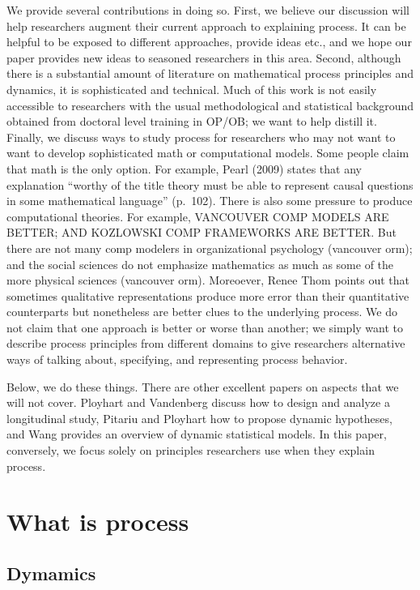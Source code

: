 \documentclass[english,,man]{apa6}
\theoremstyle{definition}
\theoremstyle{definition}
\theoremstyle{definition}
\theoremstyle{remark}
\begin{document}
We provide several contributions in doing so. First, we believe our
discussion will help researchers augment their current approach to
explaining process. It can be helpful to be exposed to different
approaches, provide ideas etc., and we hope our paper provides new ideas
to seasoned researchers in this area. Second, although there is a
substantial amount of literature on mathematical process principles and
dynamics, it is sophisticated and technical. Much of this work is not
easily accessible to researchers with the usual methodological and
statistical background obtained from doctoral level training in OP/OB;
we want to help distill it. Finally, we discuss ways to study process
for researchers who may not want to want to develop sophisticated math
or computational models. Some people claim that math is the only option.
For example, Pearl (2009) states that any explanation \enquote{worthy of
the title theory must be able to represent causal questions in some
mathematical language} (p.~102). There is also some pressure to produce
computational theories. For example, VANCOUVER COMP MODELS ARE BETTER;
AND KOZLOWSKI COMP FRAMEWORKS ARE BETTER. But there are not many comp
modelers in organizational psychology (vancouver orm); and the social
sciences do not emphasize mathematics as much as some of the more
physical sciences (vancouver orm). Moreoever, Renee Thom points out that
sometimes qualitative representations produce more error than their
quantitative counterparts but nonetheless are better clues to the
underlying process. We do not claim that one approach is better or worse
than another; we simply want to describe process principles from
different domains to give researchers alternative ways of talking about,
specifying, and representing process behavior.

Below, we do these things. There are other excellent papers on aspects
that we will not cover. Ployhart and Vandenberg discuss how to design
and analyze a longitudinal study, Pitariu and Ployhart how to propose
dynamic hypotheses, and Wang provides an overview of dynamic statistical
models. In this paper, conversely, we focus solely on principles
researchers use when they explain process.

\hypertarget{what-is-process}{%
\section{What is process}\label{what-is-process}}

\hypertarget{dymamics}{%
\subsection{Dymamics}\label{dymamics}}
\end{document}
